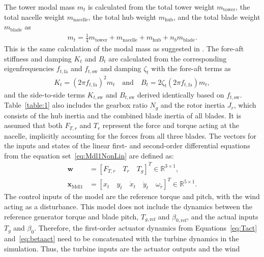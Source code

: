 The tower modal mass \( m_t \) is calculated from the total tower weight \( m_{\text{tower}} \), the total nacelle weight \( m_{\text{nacelle}} \), the total hub weight \( m_{\text{hub}} \), and the total blade weight \( m_{\text{blade}} \) as  
\begin{align} \label{eq:modalMass}
    m_t = \frac{1}{4}m_{\text{tower}} + m_{\text{nacelle}} + m_{\text{hub}} + n_b m_{\text{blade}}.
\end{align} 
This is the same calculation of the modal mass as suggested in \cite{schlipf2013nonlinear}.
The fore-aft stiffness and damping $K_t$ and $B_t$ are calculated from the corresponding eigenfrequencies $f_{t,\text{fa}}$ and  $f_{t,\text{sw}}$ and damping $\zeta_t$  with the fore-aft terms as
\begin{align} \label{eq:DampingStiffness}
    K_t = (2\pi f_{t,\text{fa}})^2 m_t\quad\text{and}\quad B_t = 2 \zeta_t (2\pi f_{t,\text{fa}}) m_t,
\end{align}
and the side-to-side terms $K_{t,\text{sw}}$ and $B_{t,\text{sw}}$ derived identically based on $f_{t,\text{sw}}$.
Table~\ref{table:1} also includes the gearbox ratio $N_g$ and the rotor inertia $J_r$, which consists of the hub inertia and the combined blade inertia of all blades. It is assumed that both $F_{T,r}$ and $T_r$ represent the force and torque acting at the nacelle, implicitly accounting for the forces from all three blades. The vectors for the inputs and states of the linear first- and second-order differential equations from the equation set~\eqref{eq:Mdl1NonLin} are defined as:
\begin{equation}\label{eq:NonLinInputDef}
    \begin{split}
        \bm{w} &= [F_{T,r} \quad T_r \quad T_g ]^T  \in \mathbb{R}^{3 \times 1},\\
        \bm{x}_{\text{Mdl1}} &= [ x_{t} \quad y_{t} \quad \dot{x}_{t} \quad \dot{y}_{t} \quad \omega_r]^T \in \mathbb{R}^{5 \times 1}.
    \end{split}
\end{equation}
The control inputs of the model are the reference torque and pitch, with the wind acting as a disturbance. This model does not include the dynamics between the reference generator torque and blade pitch, $T_{g,\text{ref}}$ and $\beta_{0,\text{ref}}$, and the actual inputs $T_{g}$ and $\beta_{0}$. Therefore, the first-order actuator dynamics from Equations~\eqref{eq:Tact} and~\eqref{eq:betaact} need to be concatenated with the turbine dynamics in the simulation. Thus, the turbine inputs are the actuator outputs and the wind 
